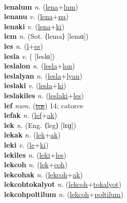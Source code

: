 \label{lenalon} \\
\textbf{lenalum} \textit{n.} (\hyperref[lena]{lena}+\hyperref[lum]{lum})
 \label{lenalum} \\
\textbf{lenanu} \textit{v.} (\hyperref[lena]{lena}+\hyperref[nu]{nu})
 \label{lenanu} \\
\textbf{lenaki} \textit{v.} (\hyperref[lena]{lena}+\hyperref[ki]{ki})
 \label{lenaki} \\
\textbf{lem} \textit{n.} (Sot. ⟨lema⟩ [lemɑ])
 \label{lem} \\
\textbf{les} \textit{n.} (\hyperref[l]{l}+\hyperref[es]{es})
 \label{les} \\
\textbf{lesla} \textit{v.} ( [leslɑ])
 \label{lesla} \\
\textbf{leslalon} \textit{n.} (\hyperref[lesla]{lesla}+\hyperref[lon]{lon})
 \label{leslalon} \\
\textbf{leslalyan} \textit{n.} (\hyperref[lesla]{lesla}+\hyperref[lyan]{lyan})
 \label{leslalyan} \\
\textbf{leslaki} \textit{v.} (\hyperref[lesla]{lesla}+\hyperref[ki]{ki})
 \label{leslaki} \\
\textbf{leslakiles} \textit{n.} (\hyperref[leslaki]{leslaki}+\hyperref[les]{les})
 \label{leslakiles} \\
\textbf{lef} \textit{num.} (\hyperref[tos]{\sout{tos}})
14; catorce \label{lef} \\
\textbf{lefak} \textit{n.} (\hyperref[lef]{lef}+\hyperref[ak]{ak})
 \label{lefak} \\
\textbf{lek} \textit{n.} (Eng. ⟨leg⟩ [lɛɡ])
 \label{lek} \\
\textbf{lekak} \textit{n.} (\hyperref[lek]{lek}+\hyperref[ak]{ak})
 \label{lekak} \\
\textbf{leki} \textit{v.} (\hyperref[le]{le}+\hyperref[ki]{ki})
 \label{leki} \\
\textbf{lekiles} \textit{n.} (\hyperref[leki]{leki}+\hyperref[les]{les})
 \label{lekiles} \\
\textbf{lekcoh} \textit{n.} (\hyperref[lek]{lek}+\hyperref[coh]{coh})
 \label{lekcoh} \\
\textbf{lekcohak} \textit{n.} (\hyperref[lekcoh]{lekcoh}+\hyperref[ak]{ak})
 \label{lekcohak} \\
\textbf{lekcohtokalyot} \textit{n.} (\hyperref[lekcoh]{lekcoh}+\hyperref[tokalyot]{tokalyot})
 \label{lekcohtokalyot} \\
\textbf{lekcohpoltilum} \textit{n.} (\hyperref[lekcoh]{lekcoh}+\hyperref[poltilum]{poltilum})
 \label{lekcohpoltilum} \\
